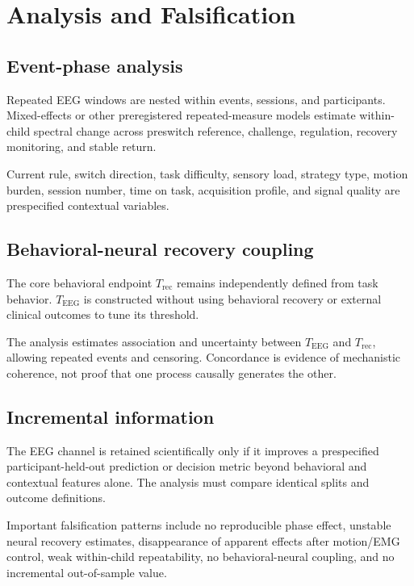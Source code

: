 \section{Analysis and Falsification}

\subsection{Event-phase analysis}

Repeated EEG windows are nested within events, sessions, and participants. Mixed-effects or other preregistered repeated-measure models estimate within-child spectral change across preswitch reference, challenge, regulation, recovery monitoring, and stable return.

Current rule, switch direction, task difficulty, sensory load, strategy type, motion burden, session number, time on task, acquisition profile, and signal quality are prespecified contextual variables.

\subsection{Behavioral-neural recovery coupling}

The core behavioral endpoint \(T_{\mathrm{rec}}\) remains independently defined from task behavior. \(T_{\mathrm{EEG}}\) is constructed without using behavioral recovery or external clinical outcomes to tune its threshold.

The analysis estimates association and uncertainty between \(T_{\mathrm{EEG}}\) and \(T_{\mathrm{rec}}\), allowing repeated events and censoring. Concordance is evidence of mechanistic coherence, not proof that one process causally generates the other.

\subsection{Incremental information}

The EEG channel is retained scientifically only if it improves a prespecified participant-held-out prediction or decision metric beyond behavioral and contextual features alone. The analysis must compare identical splits and outcome definitions.

Important falsification patterns include no reproducible phase effect, unstable neural recovery estimates, disappearance of apparent effects after motion/EMG control, weak within-child repeatability, no behavioral-neural coupling, and no incremental out-of-sample value.
